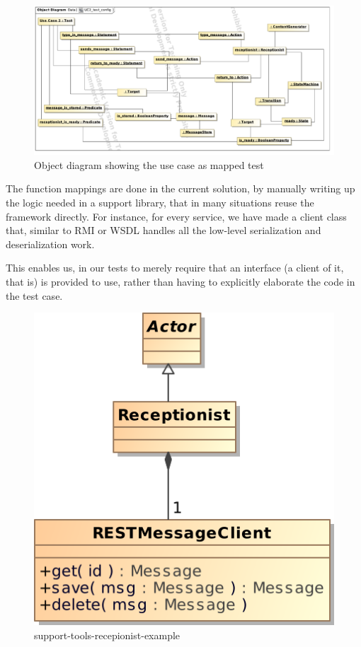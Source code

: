 \begin{figure}
 \includegraphics[scale=0.45]{img/uc2_test_config}
 \caption{Object diagram showing the use case as mapped test}
\end{figure}
The function mappings are done in the current solution, by manually writing up the logic needed in a support library, that in many situations reuse the framework directly. For instance, for every service, we have made a client class that, similar to RMI or WSDL handles all the low-level serialization and deserialization work. 

This enables us, in our tests to merely require that an interface (a client of it, that is) is provided to use, rather than having to explicitly elaborate the code in the test case.


\begin{figure}
 \centering
 \includegraphics[scale=0.60]{img/support-tools-recepionist-example}
 \caption{support-tools-recepionist-example}
 \label{fig:support-tools-recepionist-example}
\end{figure}
